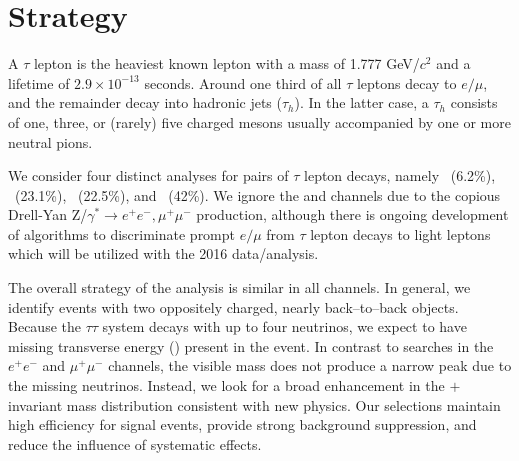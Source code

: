 \section{Strategy}\label{sec:strategy}

A $\tau$ lepton is the heaviest known lepton with a mass of 1.777 GeV/$c^2$ and a lifetime of $2.9\times10^{-13}$ seconds. Around one third of
all $\tau$ leptons decay to $e/\mu$, and the remainder decay into hadronic jets ($\tau_{h}$). 
In the latter case, a $\tau_{h}$ consists of one, three, or (rarely) five charged mesons usually accompanied by one or
more neutral pions.

We consider four distinct analyses for pairs of $\tau$ lepton decays, namely \emu ~(6.2\%), \etau ~(23.1\%), \mutau  ~(22.5\%), and
\ditauhad ~(42\%). We ignore the \EE and \MM channels due to the copious Drell-Yan
Z/$\gamma^*\rightarrow e^+e^-, \mu^+\mu^-$ production, although there is ongoing development of algorithms to discriminate prompt $e/\mu$ from $\tau$ lepton 
decays to light leptons which will be utilized with the 2016 data/analysis.

The overall strategy of the analysis is similar in all channels. 
In general, we identify events with two oppositely charged, nearly back--to--back objects. Because the $\tau\tau$ system decays with up
to four neutrinos, we expect to have missing transverse energy (\MET) present in the event. In contrast to \zprime searches in the
$e^+e^-$ and $\mu^+\mu^-$ channels, the visible \ditau mass does not produce a narrow peak due to the missing neutrinos.
Instead, we look for a broad enhancement in the \ditau$+$\MET invariant mass distribution consistent with new physics.  Our
selections maintain high efficiency for signal events, provide strong background suppression, and reduce the influence of systematic
effects.  


